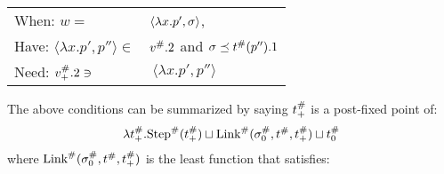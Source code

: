 \begin{center}
\begin{tabular}{|l@{\hskip2pt}l|}
    \hline
    When: \hfill $w=$                                & $\langle\lambda x.p',\sigma\rangle$,                                                                                                                      \\
    Have: \hfill $\langle\lambda x.p',p''\rangle\in$ & ${v}^{\#}.2$ and $\sigma\preceq{t}^{\#}(p'').1$                                                                                                          \\
    Need: \hfill ${v}^{\#}_+.2\ni$                    & $\:\langle\lambda x.p',p''\rangle$                                                                                                                      \\
    \hline
  \end{tabular}
\end{center}
The above conditions can be summarized by saying ${t}^{\#}_+$ is a post-fixed point of:
\[\lambda{t}^{\#}_+.{\text{Step}}^{\#}({t}^{\#}_+)\sqcup{\text{Link}}^{\#}({\sigma}^{\#}_0,{t}^{\#},{t}^{\#}_+)\sqcup{t}^{\#}_0\]
where ${\text{Link}}^{\#}({\sigma}^{\#}_0,{t}^{\#},{t}^{\#}_+)$ is the least function that satisfies:
